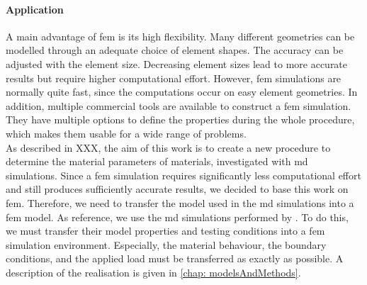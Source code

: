 \paragraph{Application}
A main advantage of \acrshort{fem} is its high flexibility. Many different geometries can be modelled through an adequate choice of element shapes. The accuracy can be adjusted with the element size. Decreasing element sizes lead to more accurate results but require higher computational effort. However, \acrshort{fem} simulations are normally quite fast, since the computations occur on easy element geometries. In addition, multiple commercial tools are available to construct a \acrshort{fem} simulation. They have multiple options to define the properties during the whole procedure, which makes them usable for a wide range of problems. \\
As described in XXX, the aim of this work is to create a new procedure to determine the material parameters of materials, investigated with \acrshort{md} simulations. Since a \acrshort{fem} simulation requires significantly less computational effort and still produces sufficiently accurate results, we decided to base this work on \acrshort{fem}. Therefore, we need to transfer the model used in the \acrshort{md} simulations into a \acrshort{fem} model. As reference, we use the \acrshort{md} simulations performed by \citet{ries_deciphering_nodate}. To do this, we must transfer their model properties and testing conditions into a \acrshort{fem} simulation environment. Especially, the material behaviour, the boundary conditions, and the applied load must be transferred as exactly as possible. A description of the realisation is given in \autoref{chap: modelsAndMethods}. 







